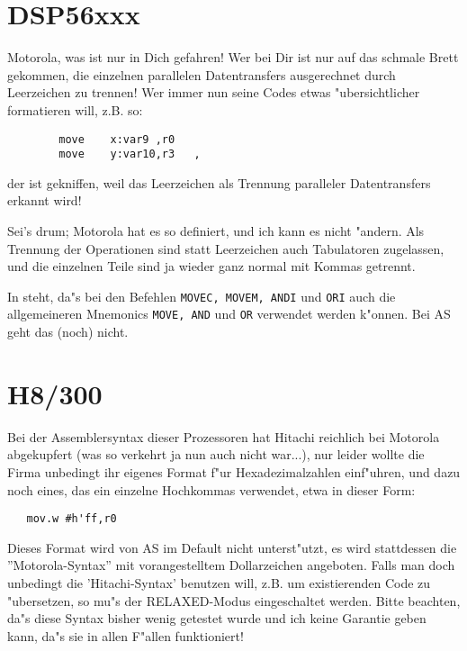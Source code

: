 \documentclass[12pt,a4paper,twoside]{report}
\newcommand{\tty}[1]{{\tt #1}}
\begin{document}

\section{DSP56xxx}

Motorola, was ist nur in Dich gefahren!  Wer bei Dir ist nur auf das
schmale Brett gekommen, die einzelnen parallelen Datentransfers
ausgerechnet durch Leerzeichen zu trennen!  Wer immer nun seine Codes
etwas "ubersichtlicher formatieren will, z.B. so:
\begin{verbatim}
        move    x:var9 ,r0
        move    y:var10,r3   ,
\end{verbatim}
der ist gekniffen, weil das Leerzeichen als Trennung paralleler
Datentransfers erkannt wird!
\par
Sei's drum; Motorola hat es so definiert, und ich kann es nicht
"andern.  Als Trennung der Operationen sind statt Leerzeichen auch
Tabulatoren zugelassen, und die einzelnen Teile sind ja wieder ganz
normal mit Kommas getrennt.
\par
In \cite{Mot56} steht, da"s bei den Befehlen \tty{MOVEC, MOVEM, ANDI} und
\tty{ORI} auch die allgemeineren Mnemonics \tty{MOVE, AND} und \tty{OR}
verwendet werden k"onnen.  Bei AS geht das (noch) nicht.


\section{H8/300}

Bei der Assemblersyntax dieser Prozessoren hat Hitachi reichlich
bei Motorola abgekupfert (was so verkehrt ja nun auch nicht war...),
nur leider wollte die Firma unbedingt ihr eigenes Format f"ur
Hexadezimalzahlen einf"uhren, und dazu noch eines, das ein einzelne
Hochkommas verwendet, etwa in dieser Form:
\begin{verbatim}
   mov.w #h'ff,r0
\end{verbatim}
Dieses Format wird von AS im Default nicht unterst"utzt, es wird
stattdessen die ''Motorola-Syntax'' mit vorangestelltem Dollarzeichen
angeboten.  Falls man doch unbedingt die 'Hitachi-Syntax' benutzen
will, z.B. um existierenden Code zu "ubersetzen, so mu"s der
RELAXED-Modus eingeschaltet werden.  Bitte beachten, da"s diese Syntax
bisher wenig getestet wurde und ich keine Garantie geben kann, da"s sie
in allen F"allen funktioniert!
\end{document}

